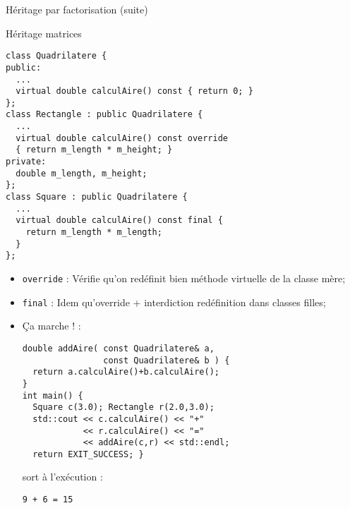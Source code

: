 \documentclass[compress,10pt,aspectratio=169]{beamer}
\begin{document}
  \begin{frame}[fragile]{Héritage par factorisation (suite)}
  \scriptsize
  \vspace*{-2mm}
  \begin{exampleblock}{\small Héritage matrices}
  \begin{minipage}{0.48\textwidth}
  \vspace*{-8mm}
  \begin{verbatim}
class Quadrilatere {
public:
  ...
  virtual double calculAire() const { return 0; }
};
class Rectangle : public Quadrilatere {
  ...
  virtual double calculAire() const override
  { return m_length * m_height; }
private:
  double m_length, m_height;
};
class Square : public Quadrilatere {
  ...
  virtual double calculAire() const final {
    return m_length * m_length;
  }
};\end{verbatim}
\end{minipage}\hfill
\begin{minipage}{0.48\textwidth}
\vspace*{-5mm}
\begin{itemize}
  \item \alert{\texttt{override}} : Vérifie qu'on redéfinit bien méthode virtuelle de la classe mère;
  \item \alert{\texttt{final}} : Idem qu'override + interdiction redéfinition dans classes filles;
  \item Ça marche ! :
\begin{verbatim}
double addAire( const Quadrilatere& a, 
                const Quadrilatere& b ) {
  return a.calculAire()+b.calculAire();
}
int main() {
  Square c(3.0); Rectangle r(2.0,3.0);
  std::cout << c.calculAire() << "+" 
            << r.calculAire() << "="
            << addAire(c,r) << std::endl;
  return EXIT_SUCCESS; }
\end{verbatim}
sort à l'exécution :
\vspace*{-1mm}
\begin{tcolorbox}[colback=black,coltext=white]
\begin{verbatim}
9 + 6 = 15
\end{verbatim}
\end{tcolorbox}
\end{itemize}
\end{minipage}
\end{exampleblock}
\end{frame}
  
\end{document}

